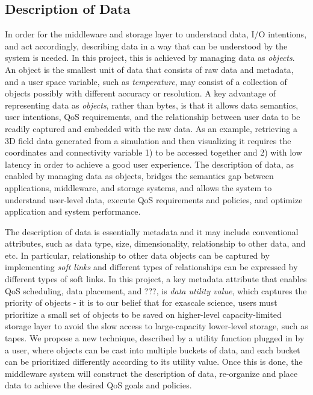 \subsection{Description of Data}
In order for the middleware and storage layer to understand data,
I/O intentions, and act accordingly, describing data in a way that can
be understood by the system is needed. In this project, this is achieved 
by managing data as \textit{objects}.
An object is the smallest unit of data that consists of raw data and metadata,
and a user space variable, such as \textit{temperature}, may consist of a collection
of objects possibly with different accuracy or resolution.
A key advantage of representing data as \textit{objects}, rather than 
bytes, is that it allows data semantics, user intentions, QoS requirements, and
the relationship between user data to be readily captured and embedded with the 
raw data. As an example, retrieving a 3D field data generated from a simulation 
and then visualizing it requires the coordinates and connectivity variable 
1) to be accessed together and 2) with low latency in order to achieve a good user experience. 
The description of data, as enabled by managing data as objects, bridges 
the semantics gap between applications, middleware, and storage systems,
and allows the system to understand user-level data, execute QoS requirements and policies, and
optimize application and system performance.


The description of data is essentially metadata and it may include conventional attributes, such as 
data type, size, dimensionality, relationship to other data, and etc. In particular,
relationship to other data objects can be captured by implementing \textit{soft links}
and different types of relationships can be expressed by different types of soft links. 
In this project, a key metadata attribute
that enables QoS scheduling, data placement, and ???, is \textit{data utility value}, which
captures the priority of objects - it is to our belief that
for exascale science, users must prioritize a small set of objects to be saved on 
higher-level capacity-limited storage layer
to avoid the slow access to large-capacity lower-level storage, such as tapes.
We propose a new technique, described by a utility function plugged in by a user, 
where objects can be cast into multiple buckets of data, and each bucket can be prioritized 
differently according to its utility value.
Once this is done, the middleware system will construct the description of data, re-organize
and place data to achieve the desired QoS goals and policies.

